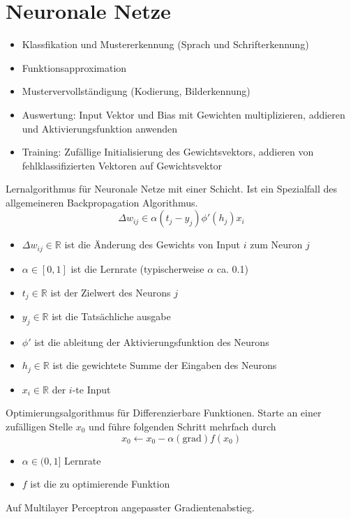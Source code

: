 \chapter{Neuronale Netze}

\begin{itemize}
    \item Klassfikation und Mustererkennung (Sprach und Schrifterkennung)
    \item Funktionsapproximation
    \item Mustervervollständigung (Kodierung, Bilderkennung)
\end{itemize}

\begin{itemize}
    \item Auswertung: Input Vektor und Bias mit Gewichten multiplizieren,
    addieren und Aktivierungsfunktion anwenden
    \item Training: Zufällige Initialisierung des Gewichtsvektors, addieren
    von fehlklassifizierten Vektoren auf Gewichtsvektor
\end{itemize}

Lernalgorithmus für Neuronale Netze mit einer Schicht. Ist ein Spezialfall
des allgemeineren Backpropagation Algorithmus.
\begin{equation}
    \Delta w_{ij} \in \alpha(t_j - y_j) \phi'(h_j)x_i
\end{equation}
\begin{itemize}
    \item $\Delta w_{ij} \in \mathbb{R}$ ist die Änderung des Gewichts von Input
    $i$ zum Neuron $j$
    \item $\alpha \in [0,1]$ ist die Lernrate (typischerweise $\alpha$ ca. 0.1)
    \item $ t_j \in \mathbb{R}$ ist der Zielwert des Neurons $j$
    \item $y_j \in \mathbb{R}$ ist die Tatsächliche ausgabe
    \item $\phi'$ ist die ableitung der Aktivierungsfunktion des Neurons
    \item $h_j \in \mathbb{R}$ ist die gewichtete Summe der Eingaben des Neurons
    \item $x_i \in \mathbb{R}$ der $i$-te Input
\end{itemize}
Optimierungsalgorithmus für Differenzierbare Funktionen. Starte an einer zufälligen
Stelle $x_0$ und führe folgenden Schritt mehrfach durch
\begin{equation}
    x_0 \leftarrow x_0 - \alpha(\text{grad})f(x_0)
\end{equation}
\begin{itemize}
    \item $\alpha \in (0,1]$ Lernrate
    \item $f$ ist die zu optimierende Funktion
\end{itemize}
Auf Multilayer Perceptron angepasster Gradientenabstieg.


